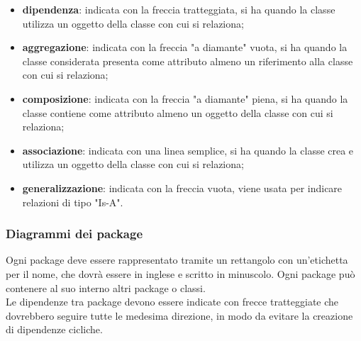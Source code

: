      	\begin{itemize}
     		\item{\textbf{dipendenza}}: indicata con la freccia tratteggiata, si ha quando la classe utilizza un oggetto della classe con cui si relaziona;
     		\item{\textbf{aggregazione}}: indicata con la freccia "a diamante" vuota, si ha quando la classe considerata presenta come attributo almeno un riferimento alla classe con cui si relaziona;
     		\item{\textbf{composizione}}: indicata con la freccia "a diamante" piena, si ha quando la classe contiene come attributo almeno un oggetto della classe con cui si relaziona;
     		\item{\textbf{associazione}}: indicata con una linea semplice, si ha quando la classe crea e utilizza un oggetto della classe con cui si relaziona;
     		\item{\textbf{generalizzazione}}: indicata con la freccia vuota, viene usata per indicare relazioni di tipo "Is-A". 
     	\end{itemize}
     	      	
     	\subsubsection*{Diagrammi dei package}
     	Ogni package deve essere rappresentato tramite un rettangolo con un'etichetta per il nome, che dovrà essere in inglese e scritto in minuscolo. Ogni package può contenere al suo interno altri package o classi. \\
     	Le dipendenze tra package devono essere indicate con frecce tratteggiate che dovrebbero seguire tutte le medesima direzione, in modo da evitare la creazione di dipendenze cicliche. 
     	
